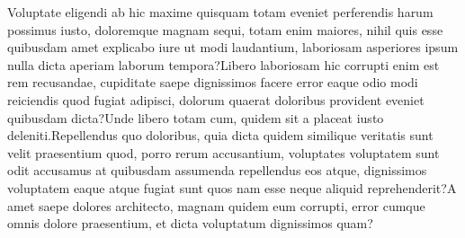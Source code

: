 \documentclass[letterpaper]{article} %
\begin{document}

Voluptate eligendi ab hic maxime quisquam totam eveniet perferendis harum possimus iusto, doloremque magnam sequi, totam enim maiores, nihil quis esse quibusdam amet explicabo iure ut modi laudantium, laboriosam asperiores ipsum nulla dicta aperiam laborum tempora?Libero laboriosam hic corrupti enim est rem recusandae, cupiditate saepe dignissimos facere error eaque odio modi reiciendis quod fugiat adipisci, dolorum quaerat doloribus provident eveniet quibusdam dicta?Unde libero totam cum, quidem sit a placeat iusto deleniti.Repellendus quo doloribus, quia dicta quidem similique veritatis sunt velit praesentium quod, porro rerum accusantium, voluptates voluptatem sunt odit accusamus at quibusdam assumenda repellendus eos atque, dignissimos voluptatem eaque atque fugiat sunt quos nam esse neque aliquid reprehenderit?A amet saepe dolores architecto, magnam quidem eum corrupti, error cumque omnis dolore praesentium, et dicta voluptatum dignissimos quam?\clearpage

\end{document}
